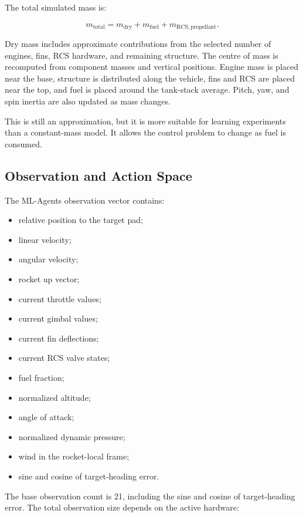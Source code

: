 \documentclass{article}
\begin{document}
The total simulated mass is:

\begin{equation}
m_{\mathrm{total}} = m_{\mathrm{dry}} + m_{\mathrm{fuel}} + m_{\mathrm{RCS,propellant}}.
\end{equation}

Dry mass includes approximate contributions from the selected number of engines, fins, RCS hardware, and remaining structure. The centre of mass is recomputed from component masses and vertical positions. Engine mass is placed near the base, structure is distributed along the vehicle, fins and RCS are placed near the top, and fuel is placed around the tank-stack average. Pitch, yaw, and spin inertia are also updated as mass changes.

This is still an approximation, but it is more suitable for learning experiments than a constant-mass model. It allows the control problem to change as fuel is consumed.

\subsection{Observation and Action Space}

The ML-Agents observation vector contains:

\begin{itemize}
    \item relative position to the target pad;
    \item linear velocity;
    \item angular velocity;
    \item rocket up vector;
    \item current throttle values;
    \item current gimbal values;
    \item current fin deflections;
    \item current RCS valve states;
    \item fuel fraction;
    \item normalized altitude;
    \item angle of attack;
    \item normalized dynamic pressure;
    \item wind in the rocket-local frame;
    \item sine and cosine of target-heading error.
\end{itemize}

The base observation count is 21, including the sine and cosine of target-heading error. The total observation size depends on the active hardware:
\end{document}
